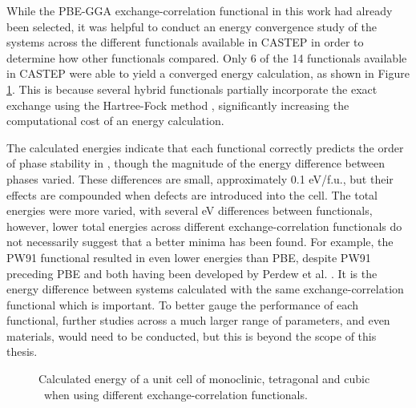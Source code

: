 While the PBE-GGA exchange-correlation functional in this work had already been selected, it was helpful to conduct an energy convergence study of the systems across the different functionals available in CASTEP in order to determine how other functionals compared. Only 6 of the 14 functionals available in CASTEP were able to yield a converged energy calculation, as shown in Figure \ref{Figure:xc_test}. This is because several hybrid functionals partially incorporate the exact exchange using the Hartree-Fock method \cite{hartree1928wave}, significantly increasing the computational cost of an energy calculation. 

The calculated energies indicate that each functional correctly predicts the order of phase stability in \zirconia , though the magnitude of the energy difference between phases varied. These differences are small, approximately 0.1 eV/f.u., but their effects are compounded when defects are introduced into the cell. The total energies were more varied, with several eV differences between functionals, however, lower total energies across different exchange-correlation functionals do not necessarily suggest that a better minima has been found. For example, the PW91 functional resulted in even lower energies than PBE, despite PW91 preceding PBE and both having been developed by Perdew et al. \cite{perdew1991unified, perdew1992atoms}. It is the energy difference between systems calculated with the same exchange-correlation functional which is important. To better gauge the performance of each functional, further studies across a much larger range of parameters, and even materials, would need to be conducted, but this is beyond the scope of this thesis.

\begin{figure}[ht!] %
  \begin{center}
    \caption{Calculated energy of a unit cell of monoclinic, tetragonal and cubic \zirconia\ when using different exchange-correlation functionals.}
    \label{Figure:xc_test}
  \end{center}
\end{figure}

